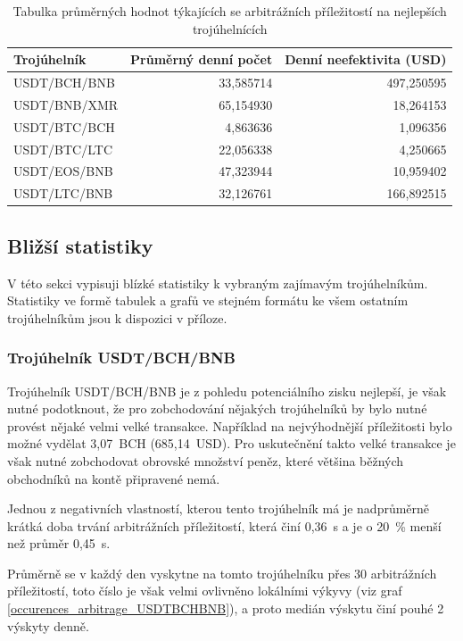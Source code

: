 \documentclass[thesis=B,czech]{FITthesis}[2019/03/21]
\begin{document}
\begin{table}\centering
\caption{Tabulka průměrných hodnot týkajících se arbitrážních příležitostí na nejlepších trojúhelnících}
\label{table_combined_best}
\begin{tabular}{|| l | r | r ||}\hline Trojúhelník & Průměrný denní počet & Denní neefektivita (USD)\\ [0.5ex]
 \hline\hline USDT/BCH/BNB & 33,585714 & 497,250595\\ 
 \hline USDT/BNB/XMR & 65,154930 & 18,264153\\ 
 \hline USDT/BTC/BCH & 4,863636 & 1,096356\\ 
 \hline USDT/BTC/LTC & 22,056338 & 4,250665\\ 
 \hline USDT/EOS/BNB & 47,323944 & 10,959402\\ 
 \hline USDT/LTC/BNB & 32,126761 & 166,892515\\ 
 \hline
\end{tabular}
\end{table}

\subsection{Bližší statistiky}
V této sekci vypisuji blízké statistiky k vybraným zajímavým trojúhelníkům. Statistiky ve formě tabulek a grafů ve stejném formátu ke všem ostatním trojúhelníkům jsou k dispozici v příloze.

\subsubsection{Trojúhelník USDT/BCH/BNB}
Trojúhelník USDT/BCH/BNB je z pohledu potenciálního zisku nejlepší, je však nutné podotknout, že pro zobchodování nějakých trojúhelníků by bylo nutné provést nějaké velmi velké transakce. Například na nejvýhodnější příležitosti bylo možné vydělat 3,07~BCH (685,14~USD). Pro uskutečnění takto velké transakce je však nutné zobchodovat obrovské množství peněz, které většina běžných obchodníků na kontě připravené nemá.

Jednou z negativních vlastností, kterou tento trojúhelník má je nadprůměrně krátká doba trvání arbitrážních příležitostí, která činí 0,36~s a je o 20~\% menší než průměr 0,45~s.

Průměrně se v každý den vyskytne na tomto trojúhelníku přes 30 arbitrážních příležitostí, toto číslo je však velmi ovlivněno lokálními výkyvy (viz graf \ref{occurences_arbitrage_USDTBCHBNB}), a proto medián výskytu činí pouhé 2 výskyty denně.
\end{document}
